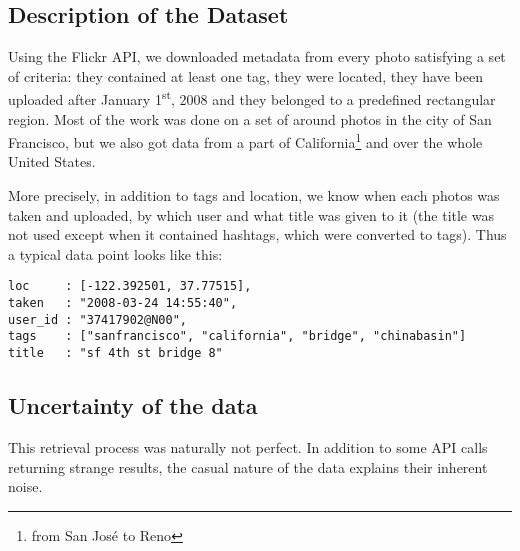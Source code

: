\subsection{Description of the Dataset}

Using the Flickr API, we downloaded metadata from every photo satisfying a set
of criteria: they contained at least one tag, they were located, they have
been uploaded after January 1\textsuperscript{st}, 2008 and they belonged to a
predefined rectangular region. Most of the work was done on a set of around
 photos in the city of San Francisco, but we also got data
from a part of California\footnote{from San José to Reno} and over the whole
United States.

More precisely, in addition to tags and location, we know when each photos was
taken and uploaded, by which user and what title was given to it (the title
was not used except when it contained hashtags, which were converted to tags).
Thus a typical data point looks like this:

\vspace{\baselineskip}
{\centering\begin{minipage}{0.7\linewidth}
  \begin{Verbatim}[frame=none, gobble=0]
loc     : [-122.392501, 37.77515],
taken   : "2008-03-24 14:55:40",
user_id : "37417902@N00",
tags    : ["sanfrancisco", "california", "bridge", "chinabasin"]
title   : "sf 4th st bridge 8"
  \end{Verbatim}
\end{minipage}\par}

\subsection{Uncertainty of the data}
\label{p:data}

This retrieval process was naturally not perfect. In addition to some API
calls returning strange results, the casual nature of the data explains their
inherent noise.

